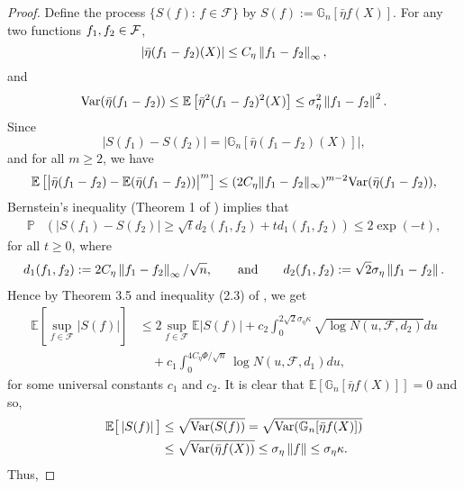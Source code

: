 \begin{proof} 
Define the process $\{S(f):\,f\in\mathcal{F}\}$ by
$S(f) := \mathbb{G}_n\left[\bar{\eta} f(X)\right].$
For any two functions $f_1, f_2\in\mathcal{F}$,
\begin{equation}\label{eq:BernsteinBound}
|\bar{\eta}(f_1 - f_2)(X)| \le C_{\eta}\left\lVert f_1 - f_2\right\rVert_{\infty},
\end{equation}
and
\begin{equation}\label{eq:BernsteinVar}
\mbox{Var}(\bar{\eta}(f_1 - f_2)) \le \mathbb{E}\left[\bar{\eta}^2(f_1 - f_2)^2(X)\right] \le \sigma^2_{{\eta}}\left\lVert f_1 - f_2\right\rVert^2.
\end{equation}
Since
\[
|S(f_1) - S(f_2)| = \left|\mathbb{G}_n\left[\bar{\eta}(f_1 - f_2)(X)\right]\right|,
\] and for all $m\ge2$, we have
\[ \mathbb{E} \left[ \big|\bar{\eta}(f_1-f_2) -\mathbb{E}(\bar{\eta}(f_1-f_2))\big|^m\right] \le (2C_{{\eta}} \|f_1-f_2\|_{\infty})^{m-2} \mbox{Var}(\bar{\eta}(f_1-f_2)),\]
 Bernstein's inequality (Theorem 1 of \cite{Geer13}) implies that
\begin{align*}
\mathbb{P}&\left(|S(f_1) - S(f_2)| \ge \sqrt{t}d_2(f_1, f_2) + td_1(f_1, f_2)\right)\le 2\exp(-t),
\end{align*}
for all $t\ge 0$, where
\begin{align*}
d_1(f_1, f_2) := 2C_{\eta}\left\lVert f_1 - f_2\right\rVert_{\infty}/\sqrt{n},\qquad\mbox{and}\qquad
d_2(f_1, f_2) := \sqrt{2}\sigma_{\eta}\left\lVert f_1 - f_2\right\rVert.
\end{align*}
Hence by Theorem 3.5 and inequality (2.3) of \cite{Dirksen}, we get
\begin{equation}\label{eq:DirksenBound}
\begin{split}
\mathbb{E}\left[\sup_{f\in\mathcal{F}}|S(f)|\right] &\le 2\sup_{f\in\mathcal{F}}\mathbb{E}\left|S(f)\right| + c_2\int_0^{2\sqrt{2}\sigma_{\eta}\kappa} \sqrt{\log N(u, \mathcal{F}, d_2)}du\\
&\quad + c_1\int_0^{4C_{\eta}\Phi/\sqrt{n}}\log N(u, \mathcal{F}, d_1)du,
\end{split}
\end{equation}
for some universal constants $c_1$ and $c_2$. It is clear that $\mathbb{E}\left[\mathbb{G}_n[\bar{\eta} f(X)]\right] = 0$ and so,
\begin{align*}
\mathbb{E}\big[\left|S(f)\right|\big] &\le \sqrt{\mbox{Var}(S(f))} = \sqrt{\mbox{Var}(\mathbb{G}_n[\bar{\eta} f(X)])}\\ &\le \sqrt{\mbox{Var}(\bar{\eta} f(X))} \le \sigma_{\eta}\left\lVert f\right\rVert \le \sigma_{\eta}\kappa.
\end{align*}
Thus,

\end{proof}
